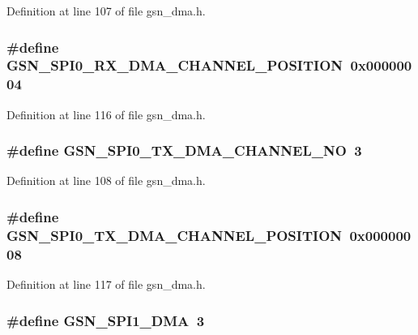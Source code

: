 Definition at line 107 of file gsn\_\-dma.h.

\hypertarget{a00484_aec38aae3207af38c56c242a61d77860c}{
\subsubsection[{GSN\_\-SPI0\_\-RX\_\-DMA\_\-CHANNEL\_\-POSITION}]{\setlength{\rightskip}{0pt plus 5cm}\#define GSN\_\-SPI0\_\-RX\_\-DMA\_\-CHANNEL\_\-POSITION~0x00000004}}
\label{a00484_aec38aae3207af38c56c242a61d77860c}


Definition at line 116 of file gsn\_\-dma.h.

\hypertarget{a00484_ad60298b55cb167a7474403a0b2db8987}{
\subsubsection[{GSN\_\-SPI0\_\-TX\_\-DMA\_\-CHANNEL\_\-NO}]{\setlength{\rightskip}{0pt plus 5cm}\#define GSN\_\-SPI0\_\-TX\_\-DMA\_\-CHANNEL\_\-NO~3}}
\label{a00484_ad60298b55cb167a7474403a0b2db8987}


Definition at line 108 of file gsn\_\-dma.h.

\hypertarget{a00484_a6d7d2c2490563e135291e01c643cf3a2}{
\subsubsection[{GSN\_\-SPI0\_\-TX\_\-DMA\_\-CHANNEL\_\-POSITION}]{\setlength{\rightskip}{0pt plus 5cm}\#define GSN\_\-SPI0\_\-TX\_\-DMA\_\-CHANNEL\_\-POSITION~0x00000008}}
\label{a00484_a6d7d2c2490563e135291e01c643cf3a2}


Definition at line 117 of file gsn\_\-dma.h.

\hypertarget{a00484_adb83f42ccdcff7832a0f4717a7b8c0f7}{
\subsubsection[{GSN\_\-SPI1\_\-DMA}]{\setlength{\rightskip}{0pt plus 5cm}\#define GSN\_\-SPI1\_\-DMA~3}}
\label{a00484_adb83f42ccdcff7832a0f4717a7b8c0f7}


